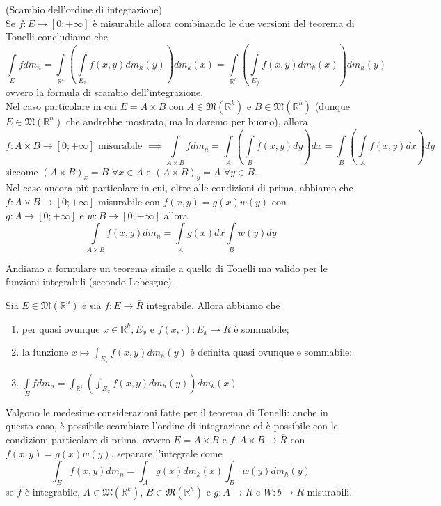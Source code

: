 \begin{remark}(Scambio dell'ordine di integrazione) \\
Se $f: E \to [0; +\infty]$ è misurabile allora combinando le due versioni del teorema di Tonelli concludiamo che
$$
	\int\limits_E fdm_n = \int\limits_{\mathbb{R}^k} \left( \int\limits_{E_x} f(x,y)dm_h(y) \right)dm_k(x) = \int\limits_{\mathbb{R}^h} \left( \int\limits_{E_y} f(x, y)dm_k(x) \right) dm_h(y)
$$
ovvero la formula di scambio dell'integrazione. \\
Nel caso particolare in cui $E = A \times B$ con $A \in \mathfrak{M}(\mathbb{R}^k)$ e $B \in \mathfrak{M}(\mathbb{R}^h)$ (dunque $E \in \mathfrak{M}(\mathbb{R}^n)$ che andrebbe mostrato, ma lo daremo per buono), allora
$$f: A \times B \to [0; +\infty] \text{ misurabile } \implies \int\limits_{A \times B} fdm_n = \int\limits_A \left(\int\limits_B f(x, y)dy\right)dx = \int\limits_B \left(\int\limits_A f(x, y)dx\right)dy$$ siccome $(A \times B)_x = B \, \, \forall x \in A$ e $(A \times B)_y = A \, \, \forall y \in B$. \\
Nel caso ancora più particolare in cui, oltre alle condizioni di prima, abbiamo che $f: A \times B \to [0; +\infty]$ misurabile con $f(x, y) = g(x)w(y)$ con $g: A \to [0; +\infty]$ e $w: B \to [0;+\infty]$ allora
$$
\int\limits_{A \times B} f(x,y)dm_n = \int\limits_A g(x)dx \int\limits_B w(y)dy
$$
\end{remark}
Andiamo a formulare un teorema simile a quello di Tonelli ma valido per le funzioni integrabili (secondo Lebesgue).
\begin{theorem}
	Sia $E \in \mathfrak{M}(\mathbb{R}^n)$ e sia $f: E \to \bar{R}$ integrabile. Allora abbiamo che
	\begin{enumerate}[label=\protect\circled{\arabic*}]
		\item per quasi ovunque $x \in \mathbb{R}^k, E_x$ e $f(x, \cdot): E_x \to \bar{R}$ è sommabile;
		\item la funzione $x \mapsto \int_{E_x} f(x, y)dm_h(y)$ è definita quasi ovunque e sommabile;
		\item $\int\limits_E fdm_n = \int_{\mathbb{R}^k} \left( \int_{E_x} f(x, y)dm_h(y) \right) dm_k(x)$ 
	\end{enumerate}
\end{theorem}
\begin{remark}
	Valgono le medesime considerazioni fatte per il teorema di Tonelli: anche in questo caso, è possibile scambiare l'ordine di integrazione
	ed è possibile con le condizioni particolare di prima, ovvero $E=A \times B$ e $f: A \times B \to \bar{R}$ con $f(x, y) = g(x)w(y)$, separare l'integrale come
	$$
	\int_E f(x, y)dm_n = \int_A g(x)dm_k(x) \int_B w(y)dm_h(y)
	$$
	se $f$ è integrabile, $A \in \mathfrak{M}(\mathbb{R}^k)$, $B \in \mathfrak{M}(\mathbb{R}^h)$ e $g: A \to \bar{R}$ e $W: b \to \bar{R}$ misurabili.
\end{remark}
